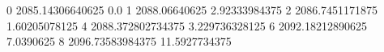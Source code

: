 0 2085.14306640625 0.0
1 2088.06640625 2.92333984375
2 2086.7451171875 1.60205078125
4 2088.372802734375 3.229736328125
6 2092.18212890625 7.0390625
8 2096.73583984375 11.5927734375
